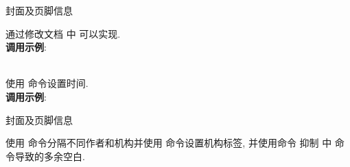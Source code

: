 \begin{frame}{封面及页脚信息}
  \vspace*{3ex}

  通过修改文档  中  可以实现.\\
  \textbf{调用示例}: \\
  \\


  使用  命令设置时间.\\
  \textbf{调用示例}: \\
\end{frame}

\begin{frame}{封面及页脚信息}

  使用  命令分隔不同作者和机构并使用  命令设置机构标签, 并使用命令 \marg*{-6pt} 抑制 \marg*{} 中  命令导致的多余空白.


\end{frame}
